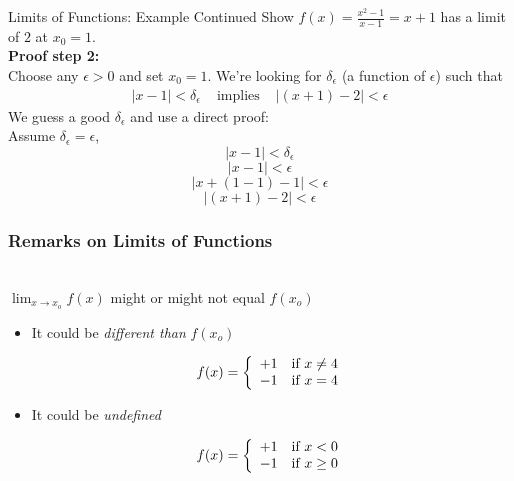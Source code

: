 \documentclass{beamer}
\numberwithin{equation}{section}
\begin{document}
\begin{frame}{Limits of Functions: Example Continued}
Show $f(x) = \frac{x^2 - 1}{x - 1} =x+1$ has a limit of $2$ at $x_{0} = 1$.\\
 
\textbf{Proof step 2:}\\\pause
Choose any $\epsilon >0$ and set $x_{0}=1$.  We're looking for $\delta_{\epsilon}$ (a function of $\epsilon$) such that 
\begin{eqnarray}
|x - 1|< \delta_{\epsilon} & \text{ implies } & |(x + 1) - 2| < \epsilon \nonumber 
\end{eqnarray} \pause
We guess a good $\delta_{\epsilon}$ and use a direct proof:\\
Assume $\delta_{\epsilon} = \epsilon$,\pause  
$$|x - 1|< \delta_{\epsilon}$$
$$|x - 1|< \epsilon$$\pause
$$|x +(1-1) - 1|< \epsilon$$\pause
$$|(x +1)- 2|< \epsilon$$		

\end{frame}

\begin{frame}
\frametitle{Remarks on Limits of Functions}

\ \\$\lim_{x\rightarrow x_o}f(x)$ might or might not equal $f(x_o)$ \pause

\begin{itemize}
\item It could be \textit{different than} $f(x_o)$ \pause

 \[
    f(x)=\left\{
                \begin{array}{lll}
                  +1&\hbox{if } x\not=4\\
                  -1&\hbox{if } x=4
                \end{array}
              \right.
  \] \pause


\item It could be \textit{undefined} \pause

 \[
    f(x)=\left\{
                \begin{array}{lll}
                  +1&\hbox{if } x<0\\
                  -1&\hbox{if } x\geq 0
                \end{array}
              \right.
  \]

\end{itemize}

\end{frame}
\end{document}
